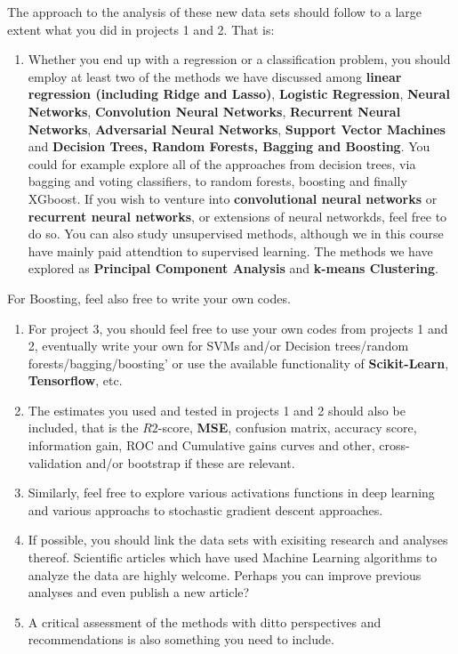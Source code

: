 \documentclass[%
oneside,                 %
final,                   %
10pt]{article}
\begin{document}
\noindent
The approach to the analysis of these new data sets should follow to a large extent what you did in projects 1 and 2. That is:
\begin{enumerate}
\item Whether you end up with a regression or a classification problem, you should employ at least two of the methods we have discussed among \textbf{linear regression (including Ridge and Lasso)}, \textbf{Logistic Regression}, \textbf{Neural Networks}, \textbf{Convolution Neural Networks}, \textbf{Recurrent Neural Networks}, \textbf{Adversarial Neural Networks}, \textbf{Support Vector Machines} and \textbf{Decision Trees, Random Forests, Bagging and Boosting}. You could for example explore  all of the approaches from decision trees, via bagging and voting classifiers, to random forests, boosting and finally XGboost. If you wish to venture into \textbf{convolutional neural networks} or \textbf{recurrent neural networks}, or extensions of neural networkds, feel free to do so. You can also study unsupervised methods, although we in this course have mainly paid attendtion to supervised learning. The methods we have explored as \textbf{Principal Component Analysis} and \textbf{k-means Clustering}.
\end{enumerate}

\noindent
For Boosting, feel also free to write your own codes.

\begin{enumerate}
\item For project 3, you should feel free to use your own codes from projects 1 and 2, eventually write your own for SVMs and/or Decision trees/random forests/bagging/boosting' or use the available functionality of \textbf{Scikit-Learn}, \textbf{Tensorflow}, etc. 

\item The estimates you used and tested in projects 1 and 2 should also be included, that is the $R2$-score, \textbf{MSE}, confusion matrix, accuracy score, information gain,  ROC and Cumulative gains curves and other, cross-validation and/or bootstrap if these are relevant.

\item Similarly, feel free to explore various activations functions in deep learning and various approachs to stochastic gradient descent approaches.

\item If possible, you should link the data sets with exisiting research and analyses thereof. Scientific articles which have used Machine Learning algorithms to analyze the data are highly welcome. Perhaps you can improve previous analyses and even publish a new article? 

\item A critical assessment of the methods with ditto perspectives and recommendations is also something you need to include.
\end{enumerate}
\end{document}
